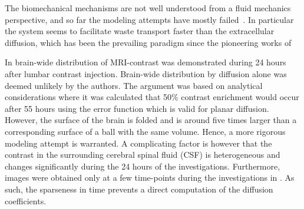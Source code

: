 \documentclass[11pt,a4paper]{article}
\newcommand{\kam}[1]{\textcolor{blue}{#1}}
\begin{document}
The biomechanical mechanisms are not well understood from a fluid mechanics perspective,
and so far the modeling attempts have mostly failed~\cite{asgari2016glymphatic, holter2017interstitial, smith2017glymphatic}. 
In particular the system seems to facilitate waste transport faster than  
the extracellular diffusion, which has been the prevailing paradigm since the pioneering works of \citet{sykova2008diffusion}



In \cite{ringstad2018brain} brain-wide distribution of MRI-contrast was demonstrated during 24 hours after lumbar contrast injection. Brain-wide distribution by diffusion alone was deemed unlikely by the authors. The argument was based on analytical considerations where it was calculated that 50\% contrast enrichment would occur after 
55 hours using the error function which is valid for planar diffusion. However, 
the surface of the brain is folded and is around five times larger than 
a corresponding surface of a ball with the same volume. Hence, 
a more rigorous modeling attempt is warranted. A complicating factor
is however that the contrast in the surrounding cerebral spinal fluid (CSF) is heterogeneous
and changes significantly during the 24 hours of the investigations. 
Furthermore, images were obtained only at a few time-points during the investigations in \cite{ringstad2018brain}. As such, the sparseness in time prevents a direct computation of the diffusion coefficients.
\end{document}

